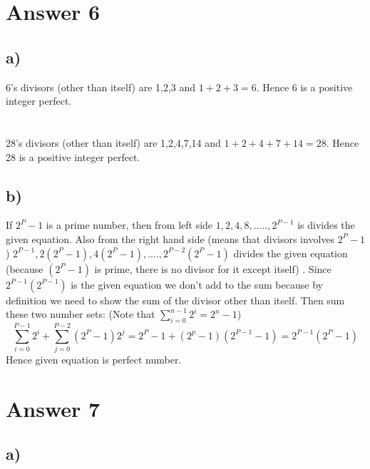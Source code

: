 \documentclass[12pt]{article}
\begin{document}
\section*{Answer 6}
\subsection*{a)}
6's divisors (other than itself) are 1,2,3 and $1+2+3=6$. Hence 6 is a positive integer perfect. \\ \\ \\
28's divisors (other than itself) are 1,2,4,7,14 and $1+2+4+7+14 =28$. Hence 28 is a positive integer perfect.
\subsection*{b)}
If $2^P-1$ is a prime number, then from left side $1,2,4,8,.....,2^{P-1}$ is divides the given equation. Also from the right hand side (means that divisors involves $2^{P}-1$)  $2^{P-1},2(2^{P}-1),4(2^{P}-1),....,2^{P-2}(2^{P}-1)$ divides the given equation (because $(2^{P}-1)$ is prime, there is no divisor for it except itself) . Since $2^{P-1}(2^{P-1})$ is the given equation we don't add to the sum because by definition we need to show the sum of the divisor other than itself. Then sum these two number sets: (Note that $\sum_{i=0}^{n-1} 2^i = 2^n-1$)
\begin{equation} 
\label{eu_eqn}
\sum_{i=0}^{P-1} 2^i + \sum_{j=0}^{P-2} (2^P-1)2^j = 2^P-1 + (2^p -1) (2^{P-1} -1) = 2^{P-1}(2^P-1)
\end{equation}
Hence given equation is perfect number.
\section*{Answer 7}
\subsection*{a)}
\end{document}
